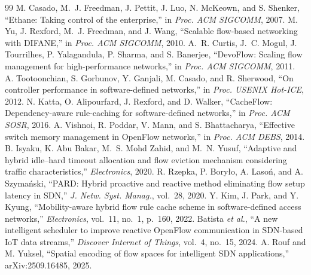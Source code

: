 \documentclass[conference]{IEEEtran}
\begin{document}

\begin{thebibliography}{99}
 M. Casado, M.~J. Freedman, J. Pettit, J. Luo, N. McKeown, and S. Shenker, ``Ethane: Taking control of the enterprise,'' in \emph{Proc. ACM SIGCOMM}, 2007.
 M. Yu, J. Rexford, M.~J. Freedman, and J. Wang, ``Scalable flow-based networking with DIFANE,'' in \emph{Proc. ACM SIGCOMM}, 2010.
 A.~R. Curtis, J.~C. Mogul, J. Tourrilhes, P. Yalagandula, P. Sharma, and S. Banerjee, ``DevoFlow: Scaling flow management for high-performance networks,'' in \emph{Proc. ACM SIGCOMM}, 2011.
 A. Tootoonchian, S. Gorbunov, Y. Ganjali, M. Casado, and R. Sherwood, ``On controller performance in software-defined networks,'' in \emph{Proc. USENIX Hot-ICE}, 2012.
 N. Katta, O. Alipourfard, J. Rexford, and D. Walker, ``CacheFlow: Dependency-aware rule-caching for software-defined networks,'' in \emph{Proc. ACM SOSR}, 2016.
 A. Vishnoi, R. Poddar, V. Mann, and S. Bhattacharya, ``Effective switch memory management in OpenFlow networks,'' in \emph{Proc. ACM DEBS}, 2014.
 B. Isyaku, K. Abu Bakar, M.~S. Mohd Zahid, and M.~N. Yusuf, ``Adaptive and hybrid idle--hard timeout allocation and flow eviction mechanism considering traffic characteristics,'' \emph{Electronics}, 2020.
 R. Rzepka, P. Boryło, A. Lasoń, and A. Szymański, ``PARD: Hybrid proactive and reactive method eliminating flow setup latency in SDN,'' \emph{J. Netw. Syst. Manag.}, vol.~28, 2020.
 Y. Kim, J. Park, and Y. Kyung, ``Mobility-aware hybrid flow rule cache scheme in software-defined access networks,'' \emph{Electronics}, vol.~11, no.~1, p.~160, 2022.
 Batista \emph{et al.}, ``A new intelligent scheduler to improve reactive OpenFlow communication in SDN-based IoT data streams,'' \emph{Discover Internet of Things}, vol.~4, no.~15, 2024.
 A. Rouf and M. Yuksel, ``Spatial encoding of flow spaces for intelligent SDN applications,'' arXiv:2509.16485, 2025.


\end{thebibliography}
\end{document}
